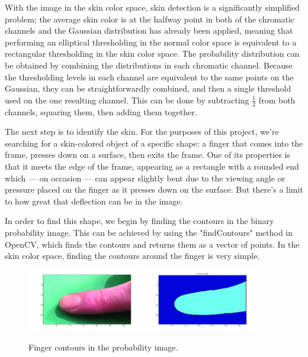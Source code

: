 With the image in the skin color space, skin detection is a significantly simplified problem; the average skin color is at the halfway point in both of the chromatic channels and the Gaussian distribution has already been applied, meaning that performing an elliptical thresholding in the normal color space is equivalent to a rectangular thresholding in the skin color space. The probability distribution can be obtained by combining the distributions in each chromatic channel. Because the thresholding levels in each channel are equivalent to the same points on the Gaussian, they can be straightforwardly combined, and then a single threshold used on the one resulting channel. This can be done by subtracting $\frac{1}{2}$ from both channels, squaring them, then adding them together.

The next step is to identify the skin. For the purposes of this project, we're searching for a skin-colored object of a specific shape: a finger that comes into the frame, presses down on a surface, then exits the frame. One of its properties is that it meets the edge of the frame, appearing as a rectangle with a rounded end which --- on occasion --- can appear slightly bent due to the viewing angle or pressure placed on the finger as it presses down on the surface. But there's a limit to how great that deflection can be in the image.

In order to find this shape, we begin by finding the contours in the binary probability image. This can be achieved by using the "findContours" method in OpenCV, which finds the contours and returns them as a vector of points. In the skin color space, finding the contours around the finger is very simple.

\begin{figure}[h!]
  \centering
      \includegraphics[width=0.45\textwidth]{Chapter4/Figs/imgJIndex1.jpg}
    \includegraphics[width=0.45\textwidth]{Chapter4/Figs/indexContours.jpg}
    \caption{Finger contours in the probability image.}\label{fig:IndexContours}
\end{figure}

